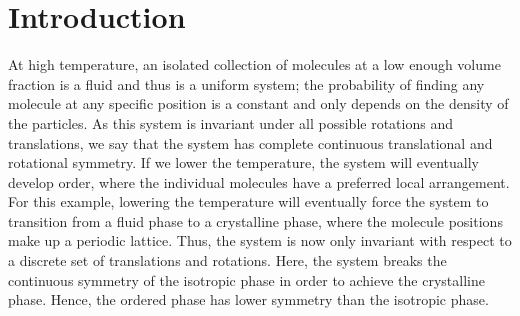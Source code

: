 \chapter{Introduction}\label{c:1}
At high temperature, an isolated collection of molecules at a low enough volume fraction is a fluid and thus is a uniform system; the probability of finding any molecule at any specific position is a constant and only depends on the density of the particles.
As this system is invariant under all possible rotations and translations, we say that the system has complete continuous translational and rotational symmetry.
If we lower the temperature, the system will eventually develop order, where the individual molecules have a preferred local arrangement.
For this example, lowering the temperature will eventually force the system to transition from a fluid phase to a crystalline phase, where the molecule positions make up a periodic lattice.
Thus, the system is now only invariant with respect to a discrete set of translations and rotations.
Here, the system breaks the continuous symmetry of the isotropic phase in order to achieve the crystalline phase.
Hence, the ordered phase has lower symmetry than the isotropic phase.

